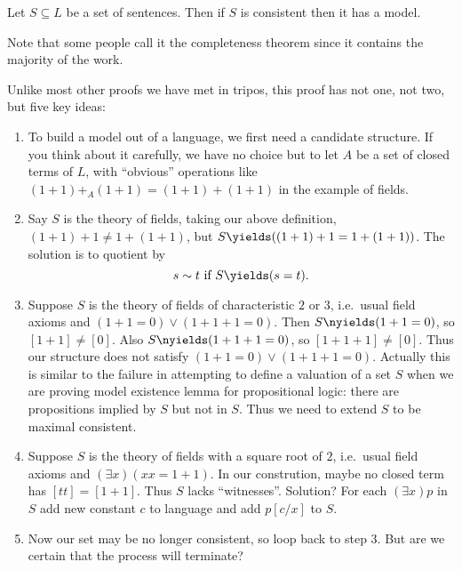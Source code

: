 \documentclass[a4paper]{article}
\begin{document}
\begin{theorem}
  \label{thm:model existence lemma}
  Let \(S \subseteq L\) be a set of sentences. Then if \(S\) is consistent then it has a model.
\end{theorem}

Note that some people call it the completeness theorem since it contains the majority of the work.

Unlike most other proofs we have met in tripos, this proof has not one, not two, but five key ideas:
\begin{enumerate}
\item To build a model out of a language, we first need a candidate structure. If you think about it carefully, we have no choice but to let \(A\) be a set of closed terms of \(L\), with ``obvious'' operations like \((1 + 1) +_A (1 + 1) = (1 + 1) + (1 + 1)\) in the example of fields.
\item Say \(S\) is the theory of fields, taking our above definition, \((1 + 1) + 1 \neq 1 + (1 + 1)\), but \(S \yields ((1 + 1) + 1 = 1 + (1 + 1))\). The solution is to quotient by
  \[
    s \sim t \text{ if } S \yields (s = t).
  \]
\item Suppose \(S\) is the theory of fields of characteristic \(2\) or \(3\), i.e.\ usual field axioms and \((1 + 1 = 0) \lor (1 + 1 + 1 = 0)\). Then \(S \nyields (1 + 1 = 0)\), so \([1 + 1] \neq [0]\). Also \(S \nyields (1 + 1 + 1 = 0)\), so \([1 + 1 + 1] \neq [0]\). Thus our structure does not satisfy \((1 + 1 = 0) \lor (1 + 1 + 1 = 0)\). Actually this is similar to the failure in attempting to define a valuation of a set \(S\) when we are proving model existence lemma for propositional logic: there are propositions implied by \(S\) but not in \(S\). Thus we need to extend \(S\) to be maximal consistent.
\item Suppose \(S\) is the theory of fields with a square root of \(2\), i.e.\ usual field axioms and \((\exists x) (xx = 1 + 1)\). In our constrution, maybe no closed term has \([tt] = [1 + 1]\). Thus \(S\) lacks ``witnesses''. Solution? For each \((\exists x) p\) in \(S\) add new constant \(c\) to language and add \(p[c/x]\) to \(S\).
\item Now our set may be no longer consistent, so loop back to step 3. But are we certain that the process will terminate?
\end{enumerate}
\end{document}
